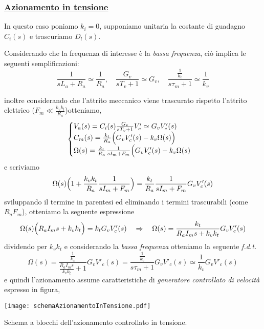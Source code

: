 \subsubsection{\underline{Azionamento in tensione}}
In questo caso poniamo $k_i = 0$, supponiamo unitaria la costante di guadagno $C_i(s)$ e trascuriamo $D_l(s)$. 

Considerando che la frequenza di interesse è la \emph{bassa frequenza}, ciò implica le seguenti semplificazioni:
\begin{equation}
	\frac{1}{sL_a + R_a} \simeq \frac{1}{R_a}, \quad \frac{G_v}{sT_v + 1} \simeq G_v, \quad \frac{\frac{1}{k_v}}{s \tau_m + 1} \simeq \frac{1}{k_v}
\end{equation}

inoltre considerando che l'attrito meccanico viene trascurato rispetto l'attrito elettrico ($F_m \ll \frac{k_v k_t}{R_a}$)otteniamo,
\begin{equation}
	\begin{cases}
		V_a(s) = C_i(s) \frac{G_v}{sT_v + 1} V'_c \simeq G_v V'_c(s)\\
		C_m(s) = \frac{k_t}{R_a}\Bigl( G_v V'_c(s) - k_v \Omega(s) \Bigr) \\
		\Omega(s) = \frac{k_t}{R_a} \frac{1}{sI_m + F_m} \Bigl( G_v V'_c(s) - k_v \Omega(s) \\
	\end{cases}
\end{equation}
e scriviamo
\begin{equation}
	 \Omega(s) \Bigl( 1 + \frac{k_v k_t}{R_a} \frac{1}{sI_m + F_m} \Bigr) = \frac{k_t}{R_a} \frac{1}{sI_m + F_m} G_v V'_c(s)
\end{equation}
sviluppando il termine in parentesi ed eliminando i termini trascurabili (come $R_aF_m$), otteniamo la seguente espressione
\begin{equation}
	\Omega(s) \Bigl( R_a I_ms + k_v k_t \Bigr) = k_t G_v V'_c(s) \quad \Rightarrow \quad \Omega(s) = \frac{k_t}{R_a I_ms + k_v k_t} G_v V'_c(s)
\end{equation}
dividendo per $k_v k_t$ e considerando la \emph{bassa frequenza} otteniamo la seguente \emph{f.d.t.}
\begin{equation}
	\Omega(s) = \frac{\frac{1}{k_v}}{\frac{R_a I_m s}{k_v k_t} + 1} G_v V'_c(s) = \frac{\frac{1}{k_v}}{s\tau_m + 1} G_v V'_c(s) \simeq \frac{1}{k_v} G_v V'_c(s)
\end{equation}
e quindi l'azionamento assume caratteristiche di \emph{generatore controllato di velocità} espresso in figura,
\begin{center}
	\texttt{[image: schemaAzionamentoInTensione.pdf]}
	\caption{Schema a blocchi dell'azionamento controllato in tensione.}
\end{center}

